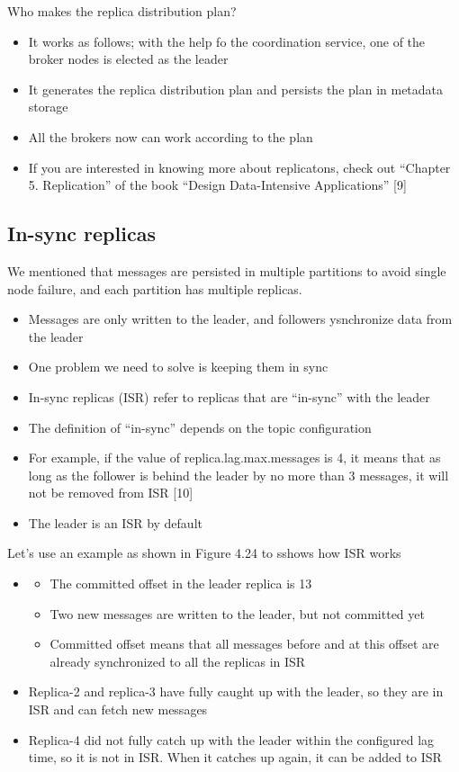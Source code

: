 \documentclass{report}
\theoremstyle{definition}
\let\oldsubsection\subsection
\renewcommand{\subsection}{\oldsubsection*}
\begin{document}
Who makes the replica distribution plan?

\begin{itemize}
\item
It works as follows; with the help fo the coordination service, one of the broker nodes is elected as the leader
\item
It generates the replica distribution plan and persists the plan in metadata storage
\item
All the brokers now can work according to the plan
\item
If you are interested in knowing more about replicatons, check out ``Chapter 5. Replication'' of the book ``Design Data-Intensive Applications'' [9]
\end{itemize}

\subsection{In-sync replicas}

We mentioned that messages are persisted in multiple partitions to avoid single node failure, and each partition has multiple replicas.

\begin{itemize}
\item
Messages are only written to the leader, and followers ysnchronize data from the leader
\item
One problem we need to solve is keeping them in sync
\item
In-sync replicas (ISR) refer to replicas that are ``in-sync'' with the leader
\item
The definition of ``in-sync'' depends on the topic configuration
\item
For example, if the value of replica.lag.max.messages is 4, it means that as long as the follower is behind the leader by no more than 3 messages, it will not be removed from ISR [10]
\item
The leader is an ISR by default
\end{itemize}

Let's use an example as shown in Figure 4.24 to sshows how ISR works

\begin{itemize}
\item

\begin{itemize}
\item
The committed offset in the leader replica is 13
\item
Two new messages are written to the leader, but not committed yet
\item
Committed offset means that all messages before and at this offset are already synchronized to all the replicas in ISR
\end{itemize}
\item
Replica-2 and replica-3 have fully caught up with the leader, so they are in ISR and can fetch new messages
\item
Replica-4 did not fully catch up with the leader within the configured lag time, so it is not in ISR. When it catches up again, it can be added to ISR
\end{itemize}
\end{document}
